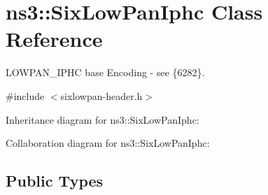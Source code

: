\hypertarget{classns3_1_1SixLowPanIphc}{}\section{ns3\+:\+:Six\+Low\+Pan\+Iphc Class Reference}
\label{classns3_1_1SixLowPanIphc}


L\+O\+W\+P\+A\+N\+\_\+\+I\+P\+HC base Encoding -\/ see \{6282\}.  




{\ttfamily \#include $<$sixlowpan-\/header.\+h$>$}



Inheritance diagram for ns3\+:\+:Six\+Low\+Pan\+Iphc\+:


Collaboration diagram for ns3\+:\+:Six\+Low\+Pan\+Iphc\+:
\subsection*{Public Types}
